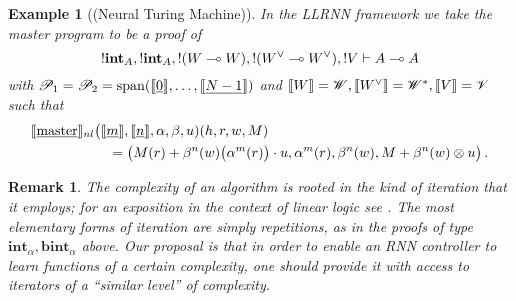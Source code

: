 \documentclass[english,letter paper,12pt,leqno]{article}
\theoremstyle{example}
\newtheorem{example}[theorem]{Example}
\newtheorem{remark}[theorem]{Remark}
\numberwithin{equation}{section}
\begin{document}
\begin{example}[(Neural Turing Machine)]
In the LLRNN framework we take the master program to be a proof of
\[
{!}\textbf{int}_A, {!} \textbf{int}_A, {!}(W \multimap W), {!}(W^{\vee} \multimap W^{\vee}), {!} V \vdash A \multimap A
\]
with $\mathscr{P}_1 = \mathscr{P}_2 = \operatorname{span}(\llbracket \underline{0} \rrbracket, \ldots, \llbracket \underline{N-1} \rrbracket)$ and $\llbracket W \rrbracket = \mathscr{W}, \llbracket W^{\vee} \rrbracket = \mathscr{W}^*, \llbracket V \rrbracket = \mathscr{V}$ such that
\begin{align*}
\llbracket \underline{\textup{master}} \rrbracket_{nl}&\big( \llbracket \underline{m} \rrbracket, \llbracket \underline{n} \rrbracket, \alpha, \beta, u )(h,r,w,M)\\
&\quad = \big(M(r) + \beta^n(w)\big( \alpha^m(r) \big) \cdot u, \alpha^m(r), \beta^n(w), M + \beta^n(w) \otimes u\big)\,.
\end{align*}
\end{example}

\begin{remark} The complexity of an algorithm is rooted in the kind of \emph{iteration} that it employs; for an exposition in the context of linear logic see \cite[\S 7]{murfet_ll}. The most elementary forms of iteration are simply repetitions, as in the proofs of type $\textbf{int}_\alpha, \textbf{bint}_\alpha$ above. Our proposal is that in order to enable an RNN controller to learn functions of a certain complexity, one should provide it with access to iterators of a ``similar level'' of complexity.
\end{remark}


\end{document}
